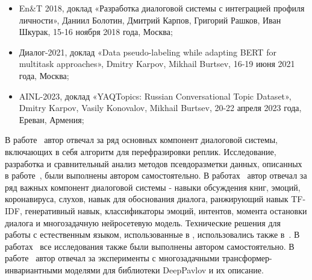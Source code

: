 {\probation}
\begin{itemize}
   \item En\&T 2018, доклад «Разработка диалоговой системы с интеграцией профиля личности», Даниил Болотин, Дмитрий Карпов, Григорий Рашков, Иван Шкурак, 15-16 ноября 2018 года, Москва;
   \item Диалог-2021, доклад «Data pseudo-labeling while adapting BERT for multitask approaches», Dmitry Karpov, Mikhail Burtsev, 16-19 июня 2021 года, Москва;
   \item AINL-2023, доклад «YAQTopics: Russian Conversational Topic Dataset», Dmitry Karpov, Vasily Konovalov, Mikhail Burtsev, 20-22 апреля 2023 года, Ереван, Армения;
\end{itemize}%


{\contribution} В работе~\cite{Болотин_Карпов_Рашков_Шкурак_2019} автор отвечал за ряд основных компонент диалоговой системы, включающих в себя алгоритм для перефразировки реплик. Исследование, разработка и сравнительный анализ методов псевдоразметки данных, описанных в работе~\cite{pseudolabel}, были выполнены автором самостоятельно. В работах~\cite{dream1,dream1_trudy,dream2} автор отвечал за ряд важных компонент диалоговой системы - навыки обсуждения книг, эмоций, коронавируса, слухов, навык для обоснования диалога, ранжирующий навык TF-IDF, генеративный навык, классификаторы эмоций, интентов, момента остановки диалога и многозадачную нейросетевую модель. Технические решения для работы с естественным языком, использованные в \cite{dream1,dream1_trudy,dream2}, использовались также в~\cite{Дуплякин_Дмитрий_Ондар_Ушаков_2021}. В работах~\cite{rumtl,enmtl,rutopics} все исследования также были выполнены автором самостоятельно. В работе~\cite{dp_2023} автор отвечал за эксперименты с многозадачными трансформер-инвариантными моделями для библиотеки DeepPavlov и их описание.

